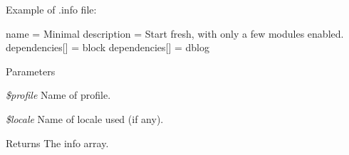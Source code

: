 Example of .info file: 
\begin{DoxyCode}
    name = Minimal
    description = Start fresh, with only a few modules enabled.
    dependencies[] = block
    dependencies[] = dblog
\end{DoxyCode}



\begin{DoxyParams}{Parameters}
\item[{\em \$profile}]Name of profile. \item[{\em \$locale}]Name of locale used (if any).\end{DoxyParams}
\begin{DoxyReturn}{Returns}
The info array. 
\end{DoxyReturn}
